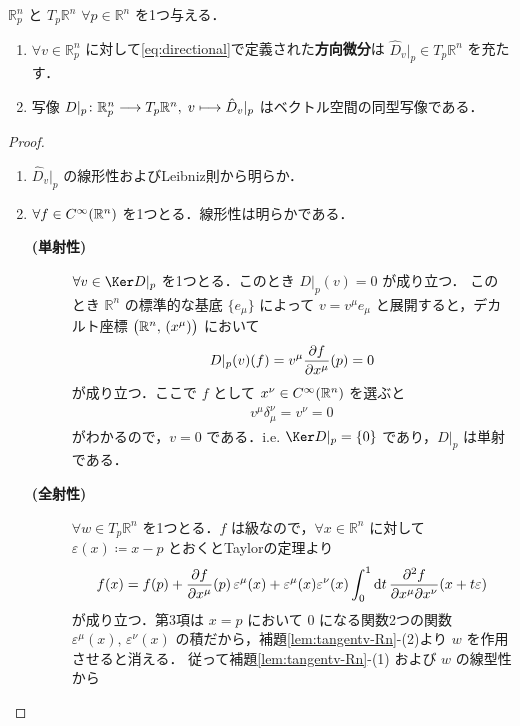 \documentclass[geometry_main]{subfiles}
\begin{document}
\begin{myprop}[label=prop:tangentv-Rn]{$\mathbb{R}^n_p$ と $T_p \mathbb{R}^n$}
	$\forall p \in \mathbb{R}^n$ を1つ与える．
	\begin{enumerate}
		\item $\forall v \in \mathbb{R}_p^n$ に対して\eqref{eq:directional}で定義された\textbf{方向微分}は $\hat{D}_{v}|_p \in T_p \mathbb{R}^n$ を充たす．
		\item 写像 $D|_p \colon \mathbb{R}^n_p \longrightarrow T_p \mathbb{R}^n,\; v \longmapsto \hat{D}_v|_p$ はベクトル空間の同型写像である．
	\end{enumerate}
\end{myprop}

\begin{proof}
	\begin{enumerate}
		\item $\hat{D}_{v}|_p$ の線形性およびLeibniz則から明らか．
		\item $\forall f \in C^\infty(\mathbb{R}^n)$ を1つとる．線形性は明らかである．
		\begin{description}
			\item[\textbf{(単射性)}] $\forall v \in \Ker D|_p$ を1つとる．このとき $D|_p (v) = 0$ が成り立つ．
			このとき $\mathbb{R}^n$ の標準的な基底 $\{e_\mu\}$ によって $v = v^\mu e_\mu$ と展開すると，デカルト座標 $\bigl(\mathbb{R}^n,\, (x^\mu)\bigr)$ において
			\begin{align}
				D|_p(v)(f) = v^\mu \pdv{f}{x^\mu} ()(p) = 0
			\end{align}
			が成り立つ．ここで $f$ として $x^\nu\in C^\infty(\mathbb{R}^n)$ を選ぶと
			\begin{align}
				v^\mu \delta^\nu_\mu = v^\nu = 0
			\end{align}
			がわかるので，$v = 0$ である．i.e. $\Ker D|_p = \{0\}$ であり，$D|_p$ は単射である．
			\item[\textbf{(全射性)}] 
			$\forall w \in T_p \mathbb{R}^n$ を1つとる．$f$ は\cinfty 級なので，$\forall x \in \mathbb{R}^n$ に対して $\varepsilon(x) \coloneqq x-p$ とおくとTaylorの定理より
			\begin{align}
				f(x) = f(p) + \pdv{f}{x^\mu}()(p)\, \varepsilon^\mu (x) + \varepsilon^\mu (x) \varepsilon^\nu (x) \int_0^1 \dd{t} \pdv[2]{f}{x^\mu}{x^\nu}()(x + t \varepsilon)
			\end{align}
			が成り立つ．第3項は $x=p$ において $0$ になる関数2つの\cinfty 関数 $\varepsilon^\mu (x),\, \varepsilon^\nu(x)$ の積だから，補題\ref{lem:tangentv-Rn}-(2)より $w$ を作用させると消える．
			従って補題\ref{lem:tangentv-Rn}-(1) および $w$ の線型性から

\end{description}
\end{enumerate}
\end{proof}
\end{document}
